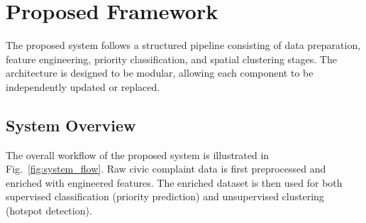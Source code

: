 \documentclass[12pt,onecolumn,draftclsnofoot]{IEEEtran}
\begin{document}
\section{Proposed Framework}

The proposed system follows a structured pipeline consisting of data preparation, feature engineering, priority classification, and spatial clustering stages. The architecture is designed to be modular, allowing each component to be independently updated or replaced.

\subsection{System Overview}

The overall workflow of the proposed system is illustrated in Fig.~\ref{fig:system_flow}. Raw civic complaint data is first preprocessed and enriched with engineered features. The enriched dataset is then used for both supervised classification (priority prediction) and unsupervised clustering (hotspot detection).
\end{document}
